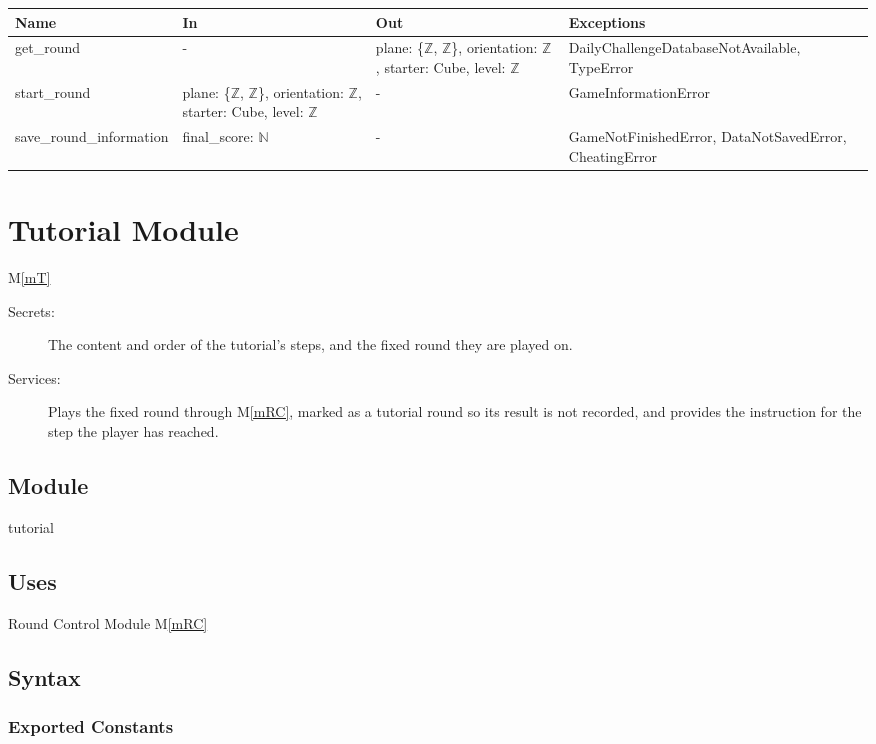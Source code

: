 \documentclass[12pt, titlepage]{article}
\newcommand{\mref}[1]{M\ref{#1}}
\begin{document}
\begin{center}
\begin{tabular}{p{4cm} p{4cm} p{4cm} p{4cm}}
\hline
\textbf{Name} & \textbf{In} & \textbf{Out} & \textbf{Exceptions} \\
\hline
get\_round & - & plane: \{$\mathbb{Z}$, $\mathbb{Z}$\}, orientation: $\mathbb{Z}$, starter: Cube, level: $\mathbb{Z}$ & DailyChallengeDatabaseNotAvailable, TypeError \\
start\_round & plane: \{$\mathbb{Z}$, $\mathbb{Z}$\}, orientation: $\mathbb{Z}$, starter: Cube, level: $\mathbb{Z}$ & - & GameInformationError \\
save\_round\_information & final\_score: $\mathbb{N}$ & - & GameNotFinishedError, DataNotSavedError, CheatingError \\
\hline
\end{tabular}
\end{center}


\newpage

\section{Tutorial Module} \mref{mT} 


\begin{description}
\item[Secrets:] The content and order of the tutorial's steps, and the fixed round they are played on.
\item[Services:] Plays the fixed round through \mref{mRC}, marked as a tutorial round so its result is not recorded, and provides the instruction for the step the player has reached.
\end{description}

\subsection{Module}

tutorial

\subsection{Uses}

Round Control Module \mref{mRC}

\subsection{Syntax}

\subsubsection{Exported Constants}
\end{document}
